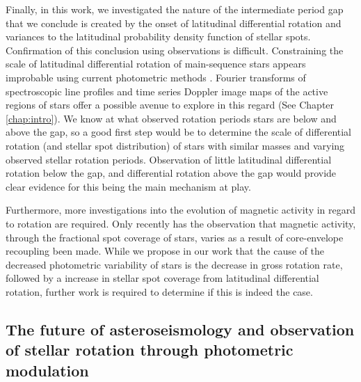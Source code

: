 Finally, in this work, we investigated the nature of the intermediate period gap that we conclude is created by the onset of latitudinal differential rotation and variances to the latitudinal probability density function of stellar spots.
Confirmation of this conclusion using observations is difficult.
Constraining the scale of latitudinal differential rotation of main-sequence stars appears improbable using current photometric methods \citep[See Section 4.3 of][]{aigrain_hare_2015}.
Fourier transforms of spectroscopic line profiles and time series Doppler image maps of the active regions of stars offer a possible avenue to explore in this regard (See Chapter \ref{chap:intro}).
We know at what observed rotation periods stars are below and above the gap, so a good first step would be to determine the scale of differential rotation (and stellar spot distribution) of stars with similar masses and varying observed stellar rotation periods.
Observation of little latitudinal differential rotation below the gap, and differential rotation above the gap would provide clear evidence for this being the main mechanism at play.

Furthermore, more investigations into the evolution of magnetic activity in regard to rotation are required.
Only recently has the observation that magnetic activity, through the fractional spot coverage of stars, varies as a result of core-envelope recoupling been made.
While we propose in our work that the cause of the decreased photometric variability of stars is the decrease in gross rotation rate, followed by a increase in stellar spot coverage from latitudinal differential rotation, further work is required to determine if this is indeed the case.

\subsection{The future of asteroseismology and observation of stellar rotation through photometric modulation}

